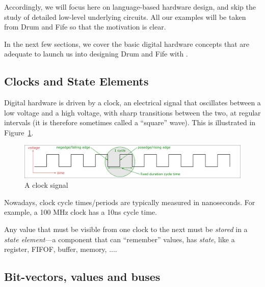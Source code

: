 Accordingly, we will focus here on {\BSV} language-based hardware design,
and skip the study of detailed low-level underlying circuits.  All our
examples will be taken from Drum and Fife so that the motivation is
clear.

In the next few sections, we cover the basic digital hardware concepts
that are adequate to launch us into designing Drum and Fife with {\BSV}.


\subsection{Clocks and State Elements}

Digital hardware is driven by a clock, an electrical signal that
oscillates between a low voltage and a high voltage, with sharp
transitions between the two, at regular intervals (it is therefore
sometimes called a ``square'' wave).  This is illustrated in
Figure~\ref{Fig_Clock_1}.

\begin{figure}[htbp]
  \centerline{\includegraphics[width=6in,angle=0]{Figures/Fig_Clock}}
  \caption{\label{Fig_Clock_1}A clock signal}
\end{figure}

Nowadays, clock cycle times/periods are typically measured in
nanoseconds. For example, a 100 MHz clock has a 10ns cycle time.


Any value that must be visible from one clock to the next must be
\emph{stored} in a \emph{state element}---a component that can
``remember'' values, {\ie} has \emph{state}, like a register, FIFOF,
buffer, memory, ....


\subsection{Bit-vectors, values and buses}


